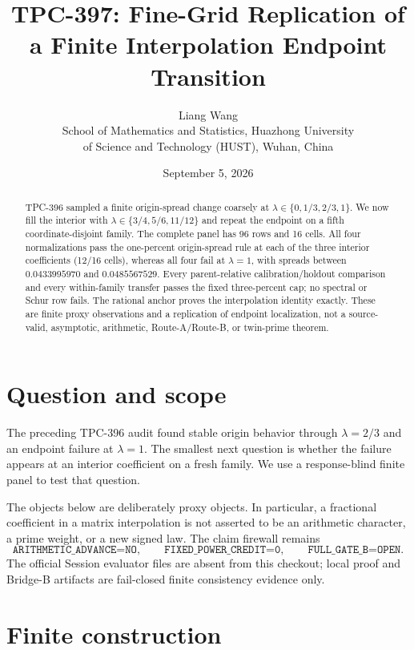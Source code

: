 \documentclass[10pt]{article}
\title{TPC-397: Fine-Grid Replication of a Finite Interpolation Endpoint Transition}
\author{Liang Wang\\
School of Mathematics and Statistics, Huazhong University\\
of Science and Technology (HUST), Wuhan, China}
\date{September 5, 2026}
\begin{document}
\maketitle

\begin{abstract}
TPC-396 sampled a finite origin-spread change coarsely at
$\lambda\in\{0,1/3,2/3,1\}$.  We now fill the interior with
$\lambda\in\{3/4,5/6,11/12\}$ and repeat the endpoint on a fifth
coordinate-disjoint family.  The complete panel has 96 rows and 16 cells.
All four normalizations pass the one-percent origin-spread rule at each of the
three interior coefficients (12/16 cells), whereas all four fail at
$\lambda=1$, with spreads between $0.0433995970$ and $0.0485567529$.  Every
parent-relative calibration/holdout comparison and every within-family
transfer passes the fixed three-percent cap; no spectral or Schur row fails.
The rational anchor proves the interpolation identity exactly.  These are
finite proxy observations and a replication of endpoint localization, not a
source-valid, asymptotic, arithmetic, Route-A/Route-B, or twin-prime theorem.
\end{abstract}

\section{Question and scope}

The preceding TPC-396 audit found stable origin behavior through
$\lambda=2/3$ and an endpoint failure at $\lambda=1$.  The smallest next
question is whether the failure appears at an interior coefficient on a fresh
family.  We use a response-blind finite panel to test that question.

The objects below are deliberately proxy objects.  In particular, a fractional
coefficient in a matrix interpolation is not asserted to be an arithmetic
character, a prime weight, or a new signed law.  The claim firewall remains
\[
 \texttt{ARITHMETIC\_ADVANCE=NO},\qquad
 \texttt{FIXED\_POWER\_CREDIT=0},\qquad
 \texttt{FULL\_GATE\_B=OPEN}.
\]
The official Session evaluator files are absent from this checkout; local
proof and Bridge-B artifacts are fail-closed finite consistency evidence only.

\section{Finite construction}
\end{document}
